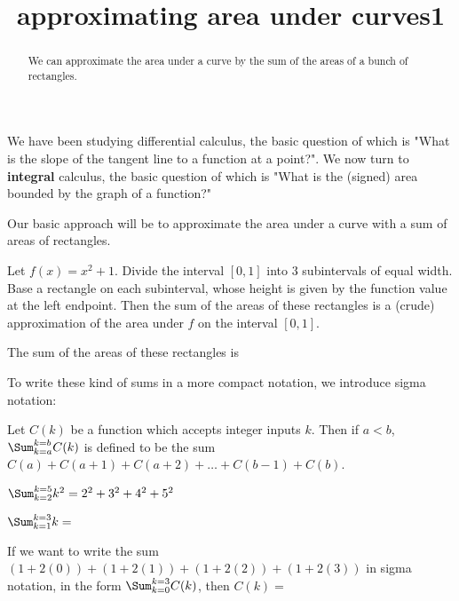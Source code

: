 \documentclass{ximera}
\title{approximating area under curves1}
\begin{document}
\begin{abstract}
	We can approximate the area under a curve by the sum of the areas of a bunch of rectangles.	
\end{abstract}

\maketitle

We have been studying differential calculus, the basic question of which is "What is the slope of the tangent line to a function at a point?".  We now turn to \textbf{integral} calculus, the basic question of which is "What is the (signed) area  bounded by the graph of a function?"

Our basic approach will be to approximate the area under a curve with a sum of areas of rectangles.


\begin{question}
	Let $f(x) = x^2+1$.  Divide the interval $[0,1]$ into $3$ subintervals of equal width.  Base a rectangle on each subinterval, whose height is given by the function value at the left endpoint.  Then the sum of the areas of these rectangles is a (crude) approximation of the area under $f$ on the interval $[0,1]$.

	
	The sum of the areas of these rectangles is 
\end{question}

To write these kind of sums in a more compact notation, we introduce sigma notation:

\begin{definition}
	Let $C(k)$ be a function which accepts integer inputs $k$.  Then if $a < b$, $\Sum_{k=a}^{k=b} C(k)$ is defined to be the sum $C(a)+C(a+1)+C(a+2)+\dots +C(b-1)+C(b)$.
\end{definition}

\begin{example}
	$\Sum_{k=2}^{k=5} k^2 = 2^2+3^2+4^2+5^2$
\end{example}

\begin{question}
	$\Sum_{k=1}^{k=3} k = $
\end{question}

\begin{question}
	If we want to write the sum $(1+2(0))+(1+2(1))+(1+2(2))+(1+2(3))$ in sigma notation, in the form $\Sum_{k=0}^{k=3} C(k)$, then $C(k)=$
\end{question}
\end{document}
